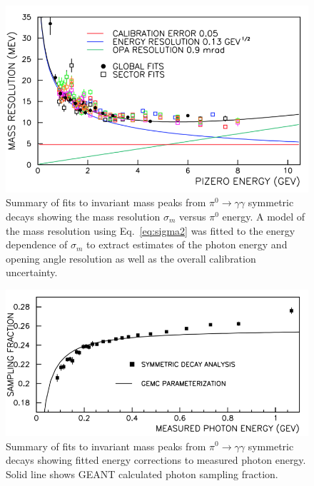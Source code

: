 \begin{figure}[hbt]
\centering
\includegraphics[width=1.0\columnwidth,keepaspectratio]{img/fx-study-summary.png}
\caption[]{Summary of fits to invariant mass peaks from $\pi^0 \rightarrow \gamma \gamma$ symmetric decays showing the mass resolution $\sigma_m$ versus $\pi^0$ energy.  A model of the mass resolution using Eq.~\ref{eq:sigma2} was fitted to the energy dependence of $\sigma_m$ to extract estimates of the photon energy and opening angle resolution as well as the overall calibration uncertainty.}
\label{fig:fx-study-summary}
\end{figure}

\begin{figure}[hbt]
\centering
\includegraphics[width=1.0\columnwidth,keepaspectratio]{img/fx-study-summary-2.png}
\caption[]{Summary of fits to invariant mass peaks from $\pi^0 \rightarrow \gamma \gamma$ symmetric decays showing fitted energy corrections to measured photon energy.  Solid line shows GEANT calculated photon sampling fraction.}
\label{fig:fx-study-summary-2}
\end{figure}

